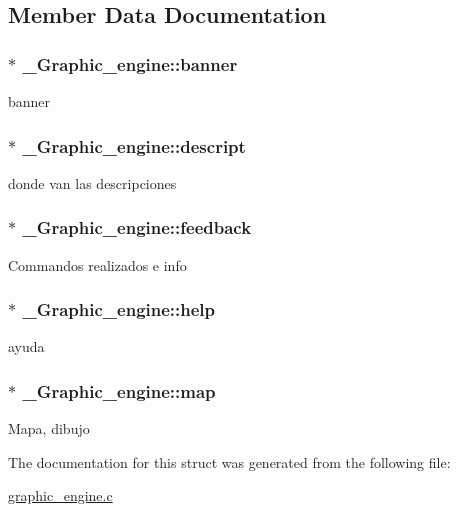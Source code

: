 \subsection{Member Data Documentation}
\hypertarget{struct__Graphic__engine_a440dfb2c23c3c4b7d3871187371117b9}{
\subsubsection[{banner}]{$\ast$ \+\_\+\+Graphic\+\_\+engine\+::banner}}\label{struct__Graphic__engine_a440dfb2c23c3c4b7d3871187371117b9}
banner \hypertarget{struct__Graphic__engine_a414bb888ecce3389c7ce348264758e58}{
\subsubsection[{descript}]{$\ast$ \+\_\+\+Graphic\+\_\+engine\+::descript}}\label{struct__Graphic__engine_a414bb888ecce3389c7ce348264758e58}
donde van las descripciones \hypertarget{struct__Graphic__engine_a4fc0ef353d000b20d57fb75d898c6d2d}{
\subsubsection[{feedback}]{$\ast$ \+\_\+\+Graphic\+\_\+engine\+::feedback}}\label{struct__Graphic__engine_a4fc0ef353d000b20d57fb75d898c6d2d}
Commandos realizados e info \hypertarget{struct__Graphic__engine_ade1d3e95ad6def427f613a4a2d101875}{
\subsubsection[{help}]{$\ast$ \+\_\+\+Graphic\+\_\+engine\+::help}}\label{struct__Graphic__engine_ade1d3e95ad6def427f613a4a2d101875}
ayuda \hypertarget{struct__Graphic__engine_a1ea06bb881d335da8c31d63b3e834bdb}{
\subsubsection[{map}]{$\ast$ \+\_\+\+Graphic\+\_\+engine\+::map}}\label{struct__Graphic__engine_a1ea06bb881d335da8c31d63b3e834bdb}
Mapa, dibujo 

The documentation for this struct was generated from the following file\+:\begin{DoxyCompactItemize}
\item 
\hyperlink{graphic__engine_8c}{graphic\+\_\+engine.\+c}\end{DoxyCompactItemize}
